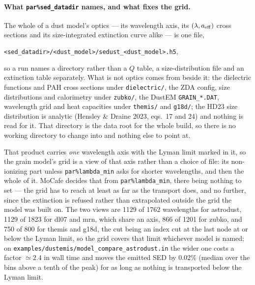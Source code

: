 \documentclass[english,a4paper]{kiseon_memo}
\newcommand{\pp}[1]{\texttt{par\%#1}}
\newcommand{\file}[1]{\texttt{#1}}
\begin{document}
\paragraph{What \pp{sed\_datadir} names, and what fixes the grid.}  The whole of
a dust model's optics --- its wavelength axis, its $(\lambda, a_{\rm eff})$
cross sections and its size-integrated extinction curve alike --- is one file,
\begin{center}
\file{<sed\_datadir>/<dust\_model>/sedust\_<dust\_model>.h5},
\end{center}
so a run names a directory rather than a $Q$ table, a size-distribution file
and an extinction table separately.  What is not optics comes from beside it:
the dielectric functions and PAH cross sections under \file{dielectric/}, the
ZDA config, size distributions and calorimetry under \file{zubko/}, the DustEM
\file{GRAIN\_*.DAT}, wavelength grid and heat capacities under \file{themis/}
and \file{g18d/}; the HD23
size distribution is analytic (Hensley \& Draine 2023, eqs.~17 and 24)
and nothing is read for it.  That directory is the data root for the whole build, so there
is no working directory to change into and nothing else to point at.

That product carries \emph{one} wavelength axis with the Lyman limit marked in
it, so the grain model's grid is a view of that axis rather than a choice of
file: its non-ionizing part unless \pp{lambda\_min} asks for shorter
wavelengths, and then the whole of it.  MoCafe decides that from
\pp{lambda\_min}, there being nothing to set --- the grid has to reach at least
as far as the transport does, and no further, since the extinction is refused
rather than extrapolated outside the grid the model was built on.  The two
views are 1129 of 1762 wavelengths for astrodust, 1129 of 1823 for dl07 and mrn,
which share an axis, 866 of 1201 for zubko, and 750 of 800 for themis and
g18d, the cut being an index cut at
the last node at or below the
Lyman limit, so the grid covers that limit whichever model is named; on \file{examples/dustemis/model\_compare\_astrodust.in} the
wider one costs a factor $\simeq 2.4$ in wall time and moves the emitted SED by
0.02\% (median over the bins above a tenth of the peak) for as long as nothing
is transported below the Lyman limit.
\end{document}

